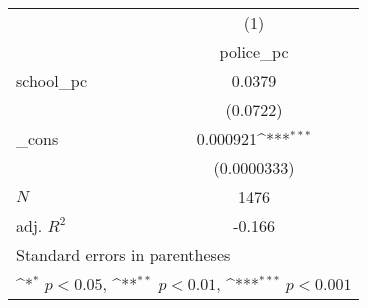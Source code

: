 {
\def\sym#1{\ifmmode^{#1}\else\(^{#1}\)\fi}
\begin{tabular}{l*{1}{c}}
\hline\hline
            &\multicolumn{1}{c}{(1)}\\
            &\multicolumn{1}{c}{police\_pc}\\
\hline
school\_pc   &      0.0379         \\
            &    (0.0722)         \\
[1em]
\_cons      &    0.000921\sym{***}\\
            & (0.0000333)         \\
\hline
\(N\)       &        1476         \\
adj. \(R^{2}\)&      -0.166         \\
\hline\hline
\multicolumn{2}{l}{\footnotesize Standard errors in parentheses}\\
\multicolumn{2}{l}{\footnotesize \sym{*} \(p<0.05\), \sym{**} \(p<0.01\), \sym{***} \(p<0.001\)}\\
\end{tabular}
}
